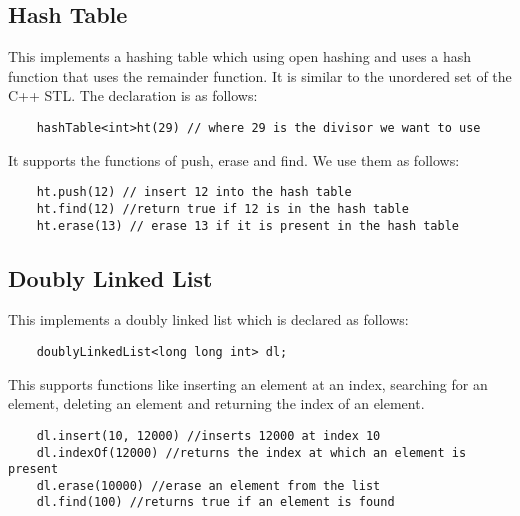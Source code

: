 \documentclass[12pt]{article}
\begin{document}
\subsection{Hash Table}
This implements a hashing table which using open hashing and uses a hash function that uses the remainder function. It is similar to the unordered set of the C++ STL. The declaration is as follows:
\begin{verbatim}
    hashTable<int>ht(29) // where 29 is the divisor we want to use
\end{verbatim}
It supports the functions of push, erase and find. We use them as follows:
\begin{verbatim}
    ht.push(12) // insert 12 into the hash table
    ht.find(12) //return true if 12 is in the hash table
    ht.erase(13) // erase 13 if it is present in the hash table 
\end{verbatim}

\subsection{Doubly Linked List}
This implements a doubly linked list which is declared as follows:
\begin{verbatim}
    doublyLinkedList<long long int> dl;
\end{verbatim}
This supports functions like inserting an element at an index, searching for an element, deleting an element and returning the index of an element.
\begin{verbatim}
    dl.insert(10, 12000) //inserts 12000 at index 10
    dl.indexOf(12000) //returns the index at which an element is present
    dl.erase(10000) //erase an element from the list
    dl.find(100) //returns true if an element is found
\end{verbatim}
\end{document}
